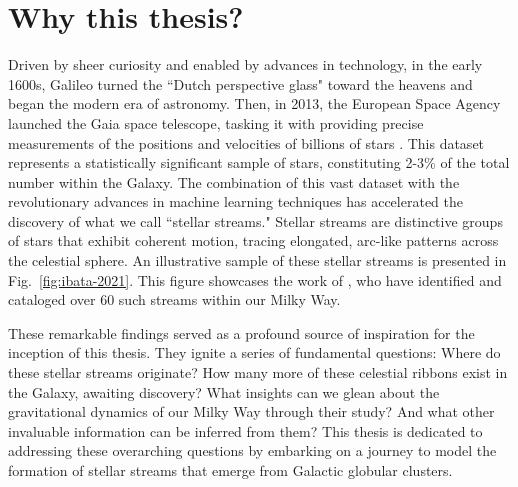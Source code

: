 \section{Why this thesis?}

Driven by sheer curiosity and enabled by advances in technology, in the early 1600s, Galileo turned the ``Dutch perspective glass" toward the heavens and began the modern era of astronomy. Then, in 2013, the European Space Agency launched the Gaia space telescope, tasking it with providing precise measurements of the positions and velocities of billions of stars \cite{2016A&A...595A...1G}. This dataset represents a statistically significant sample of stars, constituting 2-3\% of the total number within the Galaxy. The combination of this vast dataset with the revolutionary advances in machine learning techniques has accelerated the discovery of what we  call ``stellar streams." Stellar streams are distinctive groups of stars that exhibit coherent motion, tracing elongated, arc-like patterns across the celestial sphere. An illustrative sample of these stellar streams is presented in Fig.~\ref{fig:ibata-2021}. This figure showcases the work of \citet{2021ApJ...914..123I}, who have identified and cataloged over 60 such streams within our Milky Way.

These remarkable findings served as a profound source of inspiration for the inception of this thesis. They ignite a series of fundamental questions: Where do these stellar streams originate? How many more of these celestial ribbons exist in the Galaxy, awaiting discovery? What insights can we glean about the gravitational dynamics of our Milky Way through their study? And what other invaluable information can be inferred from them? This thesis is dedicated to addressing these overarching questions by embarking on a journey to model the formation of stellar streams that emerge from Galactic globular clusters.


